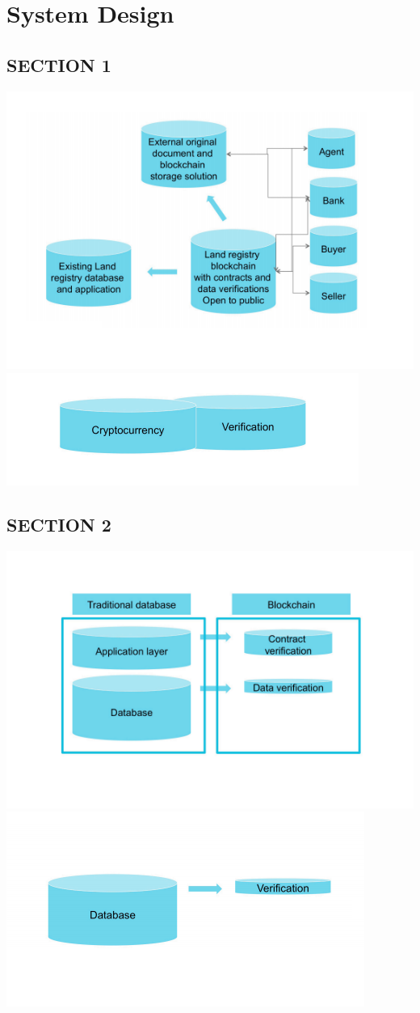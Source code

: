 \chapter{System Design}
\section{SECTION 1}
\begin{center}
\includegraphics[scale=1.2]{project/images/dbms2}\\
\includegraphics[scale=1.2]{project/images/dbms3}
\end{center}
\section{SECTION 2}
\begin{center}
 \includegraphics[scale=1.2]{project/images/dbms}
 \includegraphics[scale=1.2]{project/images/dbms4}
 \end{center}